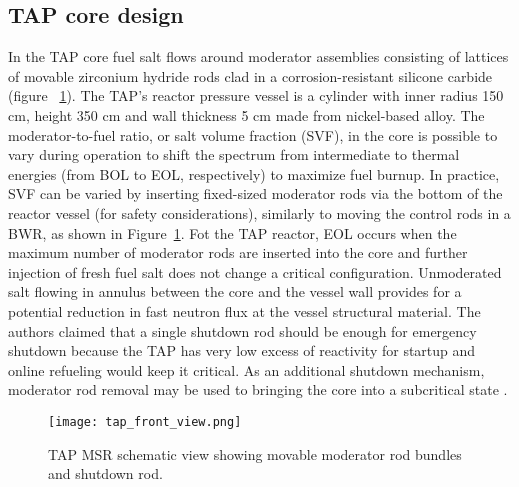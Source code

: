 \subsection{TAP core design}
In the \gls{TAP} core fuel salt flows around moderator assemblies consisting 
of lattices of 
movable zirconium hydride rods clad in a corrosion-resistant silicone carbide (figure~
\ref{fig:tap-main-view}). The \gls{TAP}'s reactor pressure vessel is a cylinder 
with inner 
radius 150 cm, 
height 350 cm and wall thickness 5 cm made from nickel-based alloy. The moderator-to-fuel 
ratio, or salt volume fraction (SVF), in the core is possible to vary during operation to 
shift the spectrum from intermediate to thermal energies (from \gls{BOL} to \gls{EOL}, 
respectively) to maximize fuel burnup. In practice, SVF can be varied by inserting 
fixed-sized moderator rods via the bottom of the reactor vessel (for safety 
considerations), similarly to moving the control rods in a \gls{BWR}, as shown in 
Figure~\ref{fig:tap-main-view}. Fot the \gls{TAP} reactor, \gls{EOL} occurs when the 
maximum number of moderator rods are inserted into the core and further injection of 
fresh fuel salt does not change a critical configuration. Unmoderated salt flowing in annulus between the core and the vessel wall provides for a potential reduction in 
fast neutron flux at the vessel structural material. The authors claimed that a 
single shutdown rod should be enough for emergency shutdown because 
the \gls{TAP} has very low excess of reactivity for startup and online refueling would 
keep it critical. As an additional shutdown mechanism, moderator rod removal may be used 
to bringing 
the core into a subcritical state \cite{transatomic_power_corporation_neutronics_2016}.

\begin{figure}[htp!] %
  \centering
  		\hspace{+1.5in}
		  \texttt{[image: tap\_front\_view.png]}
  \caption{\gls{TAP} \gls{MSR} schematic view showing movable moderator rod 
  bundles and shutdown rod.}
  \label{fig:tap-main-view}
\end{figure}

